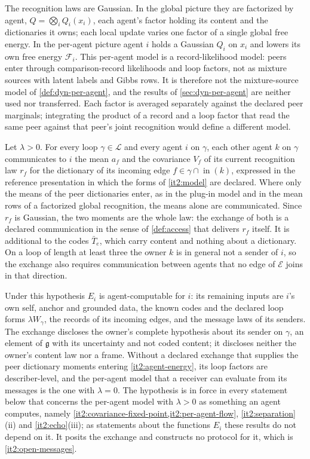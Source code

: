 The recognition laws are Gaussian. In the global picture they are factorized by agent, $Q=\bigotimes_iQ_i(x_i)$, each agent's factor holding its content and the dictionaries it owns; each local update varies one factor of a single global free energy. In the per-agent picture agent $i$ holds a Gaussian $Q_i$ on $x_i$ and lowers its own free energy $\mathcal F_i$. This per-agent model is a record-likelihood model: peers enter through comparison-record likelihoods and loop factors, not as mixture sources with latent labels and Gibbs rows. It is therefore not the mixture-source model of \cref{def:dyn-per-agent}, and the results of \cref{sec:dyn-per-agent} are neither used nor transferred. Each factor is averaged separately against the declared peer marginals; integrating the product of a record and a loop factor that read the same peer against that peer's joint recognition would define a different model.

Let $\lambda>0$. For every loop $\gamma\in\mathcal L$ and every agent $i$ on $\gamma$, each other agent $k$ on $\gamma$ communicates to $i$ the mean $a_f$ and the covariance $V_f$ of its current recognition law $r_f$ for the dictionary of its incoming edge $f\in\gamma\cap\operatorname{in}(k)$, expressed in the reference presentation in which the forms of \cref{it2:model} are declared. Where only the means of the peer dictionaries enter, as in the plug-in model and in the mean rows of a factorized global recognition, the means alone are communicated. Since $r_f$ is Gaussian, the two moments are the whole law: the exchange of both is a declared communication in the sense of \cref{def:access} that delivers $r_f$ itself. It is additional to the codes $\bar T_e$, which carry content and nothing about a dictionary. On a loop of length at least three the owner $k$ is in general not a sender of $i$, so the exchange also requires communication between agents that no edge of $\mathcal E$ joins in that direction.

Under this hypothesis $E_i$ is agent-computable for $i$: its remaining inputs are $i$'s own self, anchor and grounded data, the known codes and the declared loop forms $\lambda W_\gamma$, the records of its incoming edges, and the message laws of its senders. The exchange discloses the owner's complete hypothesis about its sender on $\gamma$, an element of $\mathfrak g$ with its uncertainty and not coded content; it discloses neither the owner's content law nor a frame. Without a declared exchange that supplies the peer dictionary moments entering \cref{it2:agent-energy}, its loop factors are describer-level, and the per-agent model that a receiver can evaluate from its messages is the one with $\lambda=0$. The hypothesis is in force in every statement below that concerns the per-agent model with $\lambda>0$ as something an agent computes, namely \cref{it2:covariance-fixed-point,it2:per-agent-flow}, \cref{it2:separation}(ii) and \cref{it2:echo}(iii); as statements about the functions $E_i$ these results do not depend on it. It posits the exchange and constructs no protocol for it, which is \cref{it2:open-messages}.

